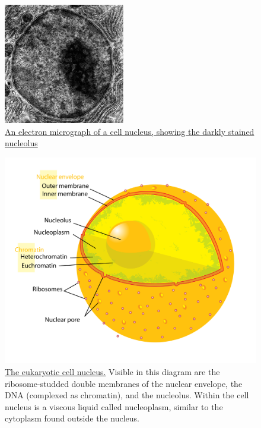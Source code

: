 \begin{figure}

{\centering \includegraphics[width=0.7\linewidth]{./figures/cells/Micrograph_of_a_cell_nucleus} 

}

\caption{\href{https://commons.wikimedia.org/wiki/File:Micrograph_of_a_cell_nucleus.png}{An electron micrograph of a cell nucleus, showing the darkly stained nucleolus}}\label{fig:electronmicronucleus}
\end{figure}



\begin{figure}

{\centering \includegraphics[width=0.7\linewidth]{./figures/cells/Diagram_human_cell_nucleus} 

}

\caption{\href{https://commons.wikimedia.org/wiki/File:Diagram_human_cell_nucleus.svg}{The eukaryotic cell nucleus.} Visible in this diagram are the ribosome-studded double membranes of the nuclear envelope, the DNA (complexed as chromatin), and the nucleolus. Within the cell nucleus is a viscous liquid called nucleoplasm, similar to the cytoplasm found outside the nucleus.}\label{fig:cellnucleus}
\end{figure}

